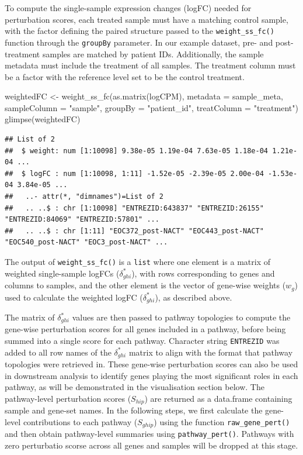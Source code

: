 \documentclass[9pt,a4paper,]{extarticle}
\newenvironment{Shaded}{\begin{snugshade}}{\end{snugshade}}
\newcommand{\AttributeTok}[1]{\textcolor[rgb]{0.77,0.63,0.00}{#1}}
\newcommand{\FunctionTok}[1]{\textcolor[rgb]{0.00,0.00,0.00}{#1}}
\newcommand{\NormalTok}[1]{#1}
\newcommand{\OtherTok}[1]{\textcolor[rgb]{0.56,0.35,0.01}{#1}}
\newcommand{\StringTok}[1]{\textcolor[rgb]{0.31,0.60,0.02}{#1}}
\begin{document}
To compute the single-sample expression changes (logFC) needed for perturbation scores, each treated sample must have a matching control sample, with the factor defining the paired structure passed to the \texttt{weight\_ss\_fc()} function through the \texttt{groupBy} parameter.
In our example dataset, pre- and post-treatment samples are matched by patient IDs.
Additionally, the sample metadata must include the treatment of all samples. The treatment column must be a factor with the reference level set to be the control treatment.

\begin{Shaded}
\begin{Highlighting}[]
\NormalTok{weightedFC }\OtherTok{\textless{}{-}} \FunctionTok{weight\_ss\_fc}\NormalTok{(}\FunctionTok{as.matrix}\NormalTok{(logCPM), }\AttributeTok{metadata =}\NormalTok{ sample\_meta,}
 \AttributeTok{sampleColumn =} \StringTok{"sample"}\NormalTok{, }\AttributeTok{groupBy =} \StringTok{"patient\_id"}\NormalTok{, }\AttributeTok{treatColumn =} \StringTok{"treatment"}\NormalTok{)}
\FunctionTok{glimpse}\NormalTok{(weightedFC)}
\end{Highlighting}
\end{Shaded}

\begin{verbatim}
## List of 2
##  $ weight: num [1:10098] 9.38e-05 1.19e-04 7.63e-05 1.18e-04 1.21e-04 ...
##  $ logFC : num [1:10098, 1:11] -1.52e-05 -2.39e-05 2.00e-04 -1.53e-04 3.84e-05 ...
##   ..- attr(*, "dimnames")=List of 2
##   .. ..$ : chr [1:10098] "ENTREZID:643837" "ENTREZID:26155" "ENTREZID:84069" "ENTREZID:57801" ...
##   .. ..$ : chr [1:11] "EOC372_post-NACT" "EOC443_post-NACT" "EOC540_post-NACT" "EOC3_post-NACT" ...
\end{verbatim}

The output of \texttt{weight\_ss\_fc()} is a \texttt{list} where one element is a matrix of weighted single-sample logFCs (\(\delta_{ghi}^*\)), with rows corresponding to genes and columns to samples, and the other element is the vector of gene-wise weights (\(w_g\)) used to calculate the weighted logFC (\(\delta_{ghi}^*\)), as described above.

The matrix of \(\delta_{ghi}^*\) values are then passed to pathway topologies to compute the gene-wise perturbation scores for all genes included in a pathway, before being summed into a single score for each pathway.
Character string \texttt{ENTREZID} was added to all row names of the \(\delta_{ghi}^*\) matrix to align with the format that pathway topologies were retrieved in.
These gene-wise perturbation scores can also be used in downstream analysis to identify genes playing the most significant roles in each pathway, as will be demonstrated in the visualisation section below.
The pathway-level perturbation scores (\(S_{hip}\)) are returned as a data.frame containing sample and gene-set names.
In the following steps, we first calculate the gene-level contributions to each pathway (\(S_{ghip}\)) using the function \texttt{raw\_gene\_pert()} and then obtain pathway-level summaries using \texttt{pathway\_pert()}.
Pathways with zero perturbatio scorse across all genes and samples will be dropped at this stage.
\end{document}
